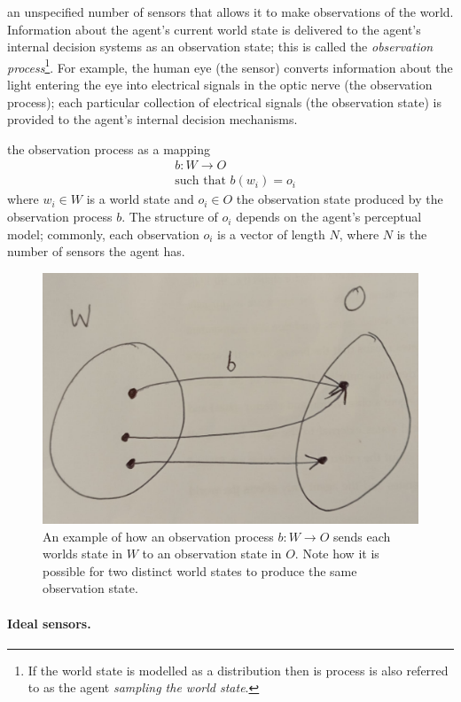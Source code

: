  an unspecified number of sensors that allows it to make observations of the world.
Information about the agent's current world state is delivered to the agent's internal decision systems as an observation state; this is called the \emph{observation process}\footnote{
If the world state is modelled as a distribution then is process is also referred to as the agent \emph{sampling the world state}.
}.
For example, the human eye (the sensor) converts information about the light entering the eye into electrical signals in the optic nerve (the observation process); each particular collection of electrical signals (the observation state) is provided to the agent's internal decision mechanisms.

 the observation process as a mapping
\begin{equation}
\begin{aligned}
	& b: W \to O \\
	& \text{such that } b(w_{i}) = o_{i}
\end{aligned}
\end{equation}
where $w_{i} \in W$ is a world state and $o_{i} \in O$ the observation state produced by the observation process $b$.
The structure of $o_{i}$ depends on the agent's perceptual model; commonly, each observation $o_{i}$ is a vector of length $N$, where $N$ is the number of sensors the agent has.

\begin{figure}[H]
	\centering
	\includegraphics[width=0.5\linewidth]{2MathematicalFramework/Images/observation_process_W_to_O.jpeg}
	\caption{
		An example of how an observation process $b: W \to O$ sends each worlds state in $W$ to an observation state in $O$.
		Note how it is possible for two distinct world states to produce the same observation state.
	}
	\label{fig:observation_process_W_to_O}
\end{figure}


\paragraph{Ideal sensors.}

